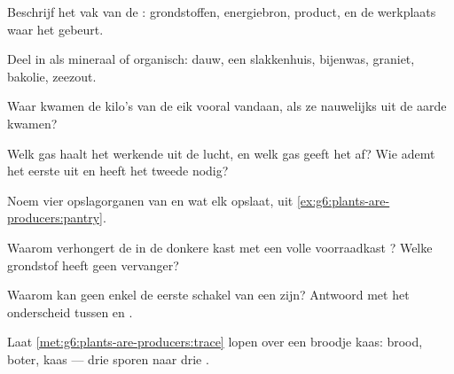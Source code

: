\begin{exercise}[$\star$]\label{exo:g6:plants-are-producers:2}
Beschrijf het vak van de : grondstoffen, energiebron, product,
en de werkplaats waar het gebeurt.
\end{exercise}

\begin{exercise}[$\star$]\label{exo:g6:plants-are-producers:3}
Deel in als mineraal of organisch: dauw, een slakkenhuis, bijenwas,
graniet, bakolie, zeezout.
\end{exercise}

\begin{exercise}[$\star$]\label{exo:g6:plants-are-producers:4}
Waar kwamen de kilo's van de eik vooral vandaan, als ze nauwelijks uit de
aarde kwamen?
\end{exercise}

\begin{exercise}[$\star$]\label{exo:g6:plants-are-producers:5}
Welk gas haalt het werkende  uit de lucht, en welk gas geeft het af?
Wie ademt het eerste uit en heeft het tweede nodig?
\end{exercise}

\begin{exercise}[$\star$]\label{exo:g6:plants-are-producers:6}
Noem vier opslagorganen van  en wat elk opslaat, uit
\cref{ex:g6:plants-are-producers:pantry}.
\end{exercise}

\begin{exercise}[$\star\star$]\label{exo:g6:plants-are-producers:7}
Waarom verhongert de  in de donkere kast met een volle voorraadkast
? Welke grondstof heeft geen vervanger?
\end{exercise}

\begin{exercise}[$\star\star$]\label{exo:g6:plants-are-producers:8}
Waarom kan geen enkel  de eerste schakel van een  zijn?
Antwoord met het onderscheid tussen  en .
\end{exercise}

\begin{exercise}[$\star\star$]\label{exo:g6:plants-are-producers:9}
Laat \cref{met:g6:plants-are-producers:trace} lopen over een broodje
kaas: brood, boter, kaas --- drie sporen naar drie .
\end{exercise}

